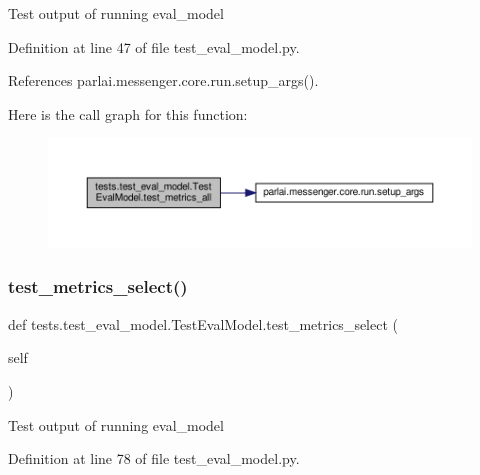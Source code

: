 \begin{DoxyVerb}Test output of running eval_model\end{DoxyVerb}
 

Definition at line 47 of file test\+\_\+eval\+\_\+model.\+py.



References parlai.\+messenger.\+core.\+run.\+setup\+\_\+args().

Here is the call graph for this function\+:
\nopagebreak
\begin{figure}[H]
\begin{center}
\leavevmode
\includegraphics[width=350pt]{classtests_1_1test__eval__model_1_1TestEvalModel_a35d01001a5c2f289c98b384e1a53e515_cgraph}
\end{center}
\end{figure}
\mbox{\label{classtests_1_1test__eval__model_1_1TestEvalModel_a7b7b27f681704f217f711b04311977c2}} 
\subsubsection{\texorpdfstring{test\+\_\+metrics\+\_\+select()}{test\_metrics\_select()}}
{\footnotesize\ttfamily def tests.\+test\+\_\+eval\+\_\+model.\+Test\+Eval\+Model.\+test\+\_\+metrics\+\_\+select (\begin{DoxyParamCaption}\item[{}]{self }\end{DoxyParamCaption})}

\begin{DoxyVerb}Test output of running eval_model\end{DoxyVerb}
 

Definition at line 78 of file test\+\_\+eval\+\_\+model.\+py.



